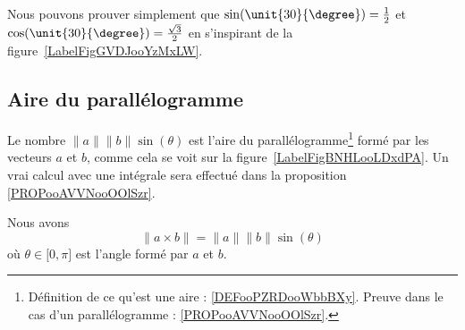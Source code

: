 Nous pouvons prouver simplement que \( \sin(\unit{30}{\degree})=\frac{ 1 }{2}\) et \( \cos(\unit{30}{\degree})=\frac{ \sqrt{3} }{2}\) en s'inspirant de la figure~\ref{LabelFigGVDJooYzMxLW}. %
\newcommand{\CaptionFigGVDJooYzMxLW}{Un triangle équilatéral de côté \( 1\).}


\subsection{Aire du parallélogramme}

\newcommand{\CaptionFigBNHLooLDxdPA}{Calculer l'aire d'un parallélogramme.}


\begin{remark}      \label{RemaAireParalProdVect}
	Le nombre \( \| a \|\| b \|\sin(\theta)\) est l'aire du parallélogramme\footnote{Définition de ce qu'est une aire : \ref{DEFooPZRDooWbbBXy}. Preuve dans le cas d'un parallélogramme : \ref{PROPooAVVNooOOlSzr}.} formé par les vecteurs \( a\) et \( b\), comme cela se voit sur la figure~\ref{LabelFigBNHLooLDxdPA}. Un vrai calcul avec une intégrale sera effectué dans la proposition \ref{PROPooAVVNooOOlSzr}.
\end{remark}

\begin{proposition}     \label{PropNormeProdVectoabsint}
	Nous avons
	\begin{equation}
		\| a\times b \|=\| a \|\| b \|\sin(\theta)
	\end{equation}
	où \( \theta\in\mathopen[ 0,\pi \mathclose]\) est l'angle formé par \( a\) et \( b\).
\end{proposition}


